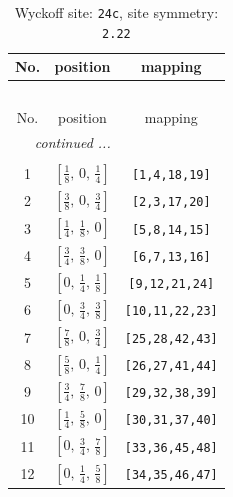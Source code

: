 \documentclass[fleqn,8pt]{jsarticle}
\begin{document}
\begin{longtable}{ccc}
\caption{Wyckoff site: {\tt 24c}, site symmetry: {\tt 2.22}}
 \\
 \hline \hline
No. & position & mapping \\ \hline \endfirsthead

\multicolumn{2}{l}{\tablename\ \thetable{}} \\
 \hline \hline
No. & position & mapping \\ \hline \endhead

 \hline \hline
\multicolumn{2}{r}{\footnotesize\it continued ...} \\ \endfoot

 \hline \hline
\multicolumn{2}{r}{} \\ \endlastfoot

1 & $\left[ \frac{1}{8},\, 0,\, \frac{1}{4} \right]$ & {\tt [1,4,18,19]} \\ \hline
2 & $\left[ \frac{3}{8},\, 0,\, \frac{3}{4} \right]$ & {\tt [2,3,17,20]} \\ \hline
3 & $\left[ \frac{1}{4},\, \frac{1}{8},\, 0 \right]$ & {\tt [5,8,14,15]} \\ \hline
4 & $\left[ \frac{3}{4},\, \frac{3}{8},\, 0 \right]$ & {\tt [6,7,13,16]} \\ \hline
5 & $\left[ 0,\, \frac{1}{4},\, \frac{1}{8} \right]$ & {\tt [9,12,21,24]} \\ \hline
6 & $\left[ 0,\, \frac{3}{4},\, \frac{3}{8} \right]$ & {\tt [10,11,22,23]} \\ \hline
7 & $\left[ \frac{7}{8},\, 0,\, \frac{3}{4} \right]$ & {\tt [25,28,42,43]} \\ \hline
8 & $\left[ \frac{5}{8},\, 0,\, \frac{1}{4} \right]$ & {\tt [26,27,41,44]} \\ \hline
9 & $\left[ \frac{3}{4},\, \frac{7}{8},\, 0 \right]$ & {\tt [29,32,38,39]} \\ \hline
10 & $\left[ \frac{1}{4},\, \frac{5}{8},\, 0 \right]$ & {\tt [30,31,37,40]} \\ \hline
11 & $\left[ 0,\, \frac{3}{4},\, \frac{7}{8} \right]$ & {\tt [33,36,45,48]} \\ \hline
12 & $\left[ 0,\, \frac{1}{4},\, \frac{5}{8} \right]$ & {\tt [34,35,46,47]} \\
\end{longtable}
\renewcommand{\arraystretch}{1.2}
\end{document}
